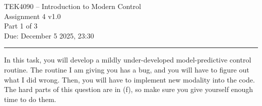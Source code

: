 \documentclass[12pt, onecolumn, a4paper]{exam}
\begin{document}
\begingroup  
    \centering
    \LARGE TEK4090 -- Introduction to Modern Control\\
    \LARGE Assignment 4 v1.0\\[0.5em]
    \LARGE Part 1 of 3\\
    \large Due: December 5 2025, 23:30\\
\endgroup
\rule{\textwidth}{0.4pt}
\printanswers


\renewcommand{\solutiontitle}{\noindent\textbf{Ans:}\enspace}   %

\begin{questions}


\question[30] In this task, you will develop a mildly under-developed model-predictive control routine. The routine I am giving you has a bug, and you will have to figure out what I did wrong. Then, you will have to implement new modality into the code. The hard parts of this question are in (f), so make sure you give yourself enough time to do them.
\end{questions}
\end{document}
